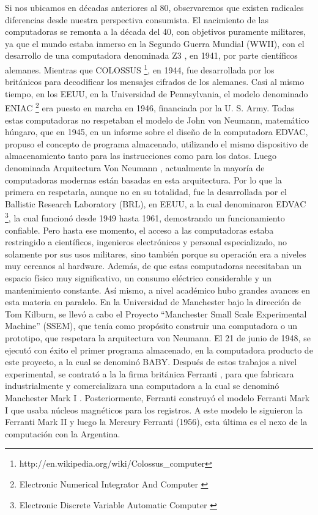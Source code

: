 \documentclass[%
 	final,
%
	notitlepage,
	narroweqnarray,
	inline,
 	twoside,
	]{ieee}
\newcommand{\link}[1]{\textit{}{#1}}
\begin{document}
Si nos ubicamos en d\'ecadas anteriores al 80, observaremos que existen radicales diferencias desde nuestra perspectiva consumista.
El nacimiento de las computadoras se remonta a la d\'ecada del 40, con objetivos puramente militares, ya que el mundo estaba inmerso en la Segundo Guerra Mundial (WWII), con el desarrollo de una computadora denominada Z3 \cite{z3}, en 1941, por parte cient\'ificos alemanes. Mientras que COLOSSUS \footnote{\link{http://en.wikipedia.org/wiki/Colossus\_computer}}, en 1944, fue desarrollada por los brit\'anicos para decodificar los mensajes cifrados de los alemanes. Casi al mismo tiempo, en los EEUU, en la Universidad de Pennsylvania, el modelo denominado ENIAC \footnote{Electronic Numerical Integrator And Computer \cite{eniac}} era puesto en marcha en 1946, financiada por la U. S. Army.
Todas estas computadoras no respetaban el modelo de John von Neumann, matem\'atico h\'ungaro, que en 1945, en un informe sobre el dise\~no de la computadora EDVAC, propuso el concepto de programa almacenado, utilizando el mismo dispositivo de almacenamiento tanto para las instrucciones como para los datos. Luego denominada Arquitectura Von Neumann \cite{newmann}, actualmente la mayor\'ia de computadoras modernas est\'an basadas en esta arquitectura.
Por lo que la primera en respetarla, aunque no en su totalidad, fue la desarrollada por el Ballistic Research Laboratory (BRL), en EEUU, a la cual denominaron EDVAC \footnote{Electronic Discrete Variable Automatic Computer \cite{edvac}}, la cual funcion\'o desde 1949 hasta 1961, demostrando un funcionamiento confiable.
Pero hasta ese momento, el acceso a las computadoras estaba restringido a cient\'ificos, ingenieros electr\'onicos y personal especializado, no solamente por sus usos militares, sino tambi\'en porque su operaci\'on era a niveles muy cercanos al hardware. Adem\'as, de que estas computadoras necesitaban un espacio f\'isico muy significativo, un consumo el\'ectrico considerable y un mantenimiento constante.
As\'i mismo, a nivel acad\'emico hubo grandes avances en esta materia en paralelo. En la Universidad de Manchester bajo la direcci\'on de Tom Kilburn, se llev\'o a cabo el Proyecto “Manchester Small Scale Experimental Machine” (SSEM), que ten\'ia como prop\'osito construir una computadora o un prototipo, que respetara la arquitectura von Neumann. El 21 de junio de 1948, se ejecut\'o con \'exito el primer programa almacenado, en la computadora producto de este proyecto, a la cual se denomin\'o BABY.
Despu\'es de estos trabajos a nivel experimental, se contrat\'o a la la firma brit\'anica Ferranti \cite{ferranti}, para que fabricara industrialmente y comercializara una computadora a la cual se denomin\'o Manchester Mark I \cite{mark1}.
Posteriormente, Ferranti construy\'o el modelo Ferranti Mark I que usaba n\'ucleos magn\'eticos para los registros. A este modelo le siguieron la Ferranti Mark II y luego la Mercury Ferranti (1956), esta \'ultima es el nexo de la computaci\'on con la Argentina.
\end{document}
